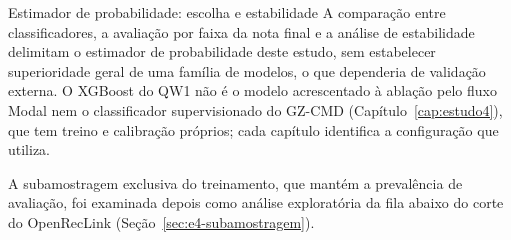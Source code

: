 \begin{chapter}{Estimador de probabilidade: escolha e estabilidade}
A comparação entre classificadores, a avaliação por faixa da nota final e a análise de estabilidade delimitam o estimador de probabilidade deste estudo, sem estabelecer superioridade geral de uma família de modelos, o que dependeria de validação externa. O XGBoost do QW1 não é o modelo acrescentado à ablação pelo fluxo Modal nem o classificador supervisionado do GZ-CMD (Capítulo~\ref{cap:estudo4}), que tem treino e calibração próprios; cada capítulo identifica a configuração que utiliza.

A subamostragem exclusiva do treinamento, que mantém a prevalência de avaliação, foi examinada depois como análise exploratória da fila abaixo do corte do OpenRecLink (Seção~\ref{sec:e4-subamostragem}).

\end{chapter}
